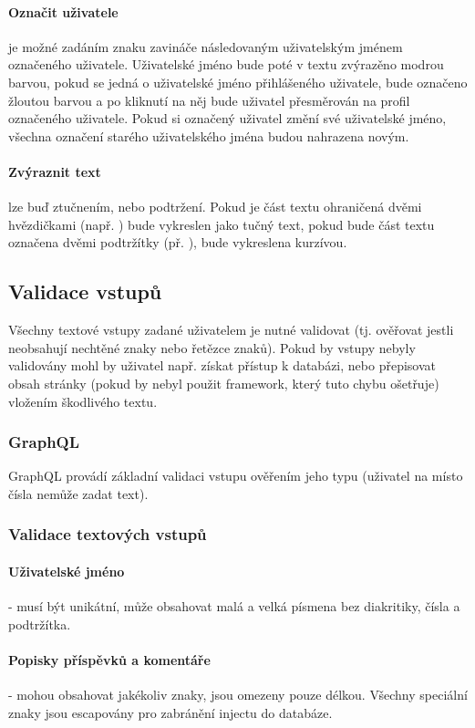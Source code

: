 \documentclass[12pt, a4paper,
 twoside,        %
 openright
]{report}
\begin{document}
\paragraph{Označit uživatele} je možné zadáním znaku zavináče následovaným uživatelským jménem označeného uživatele. Uživatelské jméno bude poté v textu zvýrazěno modrou barvou, pokud se jedná o uživatelské jméno přihlášeného uživatele, bude označeno žloutou barvou a po kliknutí na něj bude uživatel přesměrován na profil označeného uživatele. Pokud si označený uživatel změní své uživatelské jméno, všechna označení starého uživatelského jména budou nahrazena novým.
\paragraph{Zvýraznit text} lze buď ztučnením, nebo podtržení. Pokud je část textu ohraničená dvěmi hvězdičkami (např. ) bude vykreslen jako tučný text, pokud bude část textu označena dvěmi podtržítky (př. ), bude vykreslena kurzívou.

\subsection{Validace vstupů}
Všechny textové vstupy zadané uživatelem je nutné validovat (tj. ověřovat jestli neobsahují nechtěné znaky nebo řetězce znaků). Pokud by vstupy nebyly validovány mohl by uživatel např. získat přístup k databázi, nebo přepisovat obsah stránky (pokud by nebyl použit framework, který tuto chybu ošetřuje) vložením škodlivého textu.
\subsubsection{GraphQL}
GraphQL provádí základní validaci vstupu ověřením jeho typu (uživatel na místo čísla nemůže zadat text).
\subsubsection{Validace textových vstupů}
\paragraph{Uživatelské jméno}\label{paragraph:username} - musí být unikátní, může obsahovat malá a velká písmena bez diakritiky, čísla a podtržítka.
\paragraph{Popisky příspěvků a komentáře} - mohou obsahovat jakékoliv znaky, jsou omezeny pouze délkou. Všechny speciální znaky jsou escapovány pro zabránění injectu do databáze.
\end{document}
